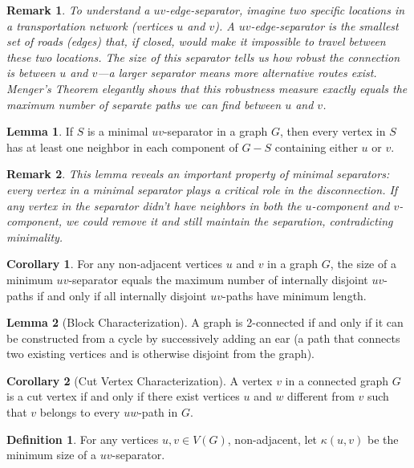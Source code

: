 \documentclass{article}
\newtheorem{remark}{Remark}
\theoremstyle{definition}
\newtheorem{lemma}{Lemma}
\newtheorem{corollary}{Corollary}
\newtheorem{definition}{Definition}
\begin{document}
\begin{remark}
To understand a $uv$-edge-separator, imagine two specific locations in a transportation network (vertices $u$ and $v$). A $uv$-edge-separator is the smallest set of roads (edges) that, if closed, would make it impossible to travel between these two locations. The size of this separator tells us how robust the connection is between $u$ and $v$—a larger separator means more alternative routes exist. Menger's Theorem elegantly shows that this robustness measure exactly equals the maximum number of separate paths we can find between $u$ and $v$.
\end{remark}

\begin{lemma}
If $S$ is a minimal $uv$-separator in a graph $G$, then every vertex in $S$ has at least one neighbor in each component of $G - S$ containing either $u$ or $v$.
\end{lemma}

\begin{remark}
This lemma reveals an important property of minimal separators: every vertex in a minimal separator plays a critical role in the disconnection. If any vertex in the separator didn't have neighbors in both the $u$-component and $v$-component, we could remove it and still maintain the separation, contradicting minimality.
\end{remark}

\begin{corollary}
For any non-adjacent vertices $u$ and $v$ in a graph $G$, the size of a minimum $uv$-separator equals the maximum number of internally disjoint $uv$-paths if and only if all internally disjoint $uv$-paths have minimum length.
\end{corollary}


\begin{lemma}[Block Characterization]
A graph is 2-connected if and only if it can be constructed from a cycle by successively adding an ear (a path that connects two existing vertices and is otherwise disjoint from the graph).
\end{lemma}

\begin{corollary}[Cut Vertex Characterization]
A vertex $v$ in a connected graph $G$ is a cut vertex if and only if there exist vertices $u$ and $w$ different from $v$ such that $v$ belongs to every $uw$-path in $G$.
\end{corollary}

\begin{definition}
For any vertices $u, v \in V(G)$, non-adjacent, let $\kappa(u,v)$ be the minimum size of a $uv$-separator.
\end{definition}
\end{document}
